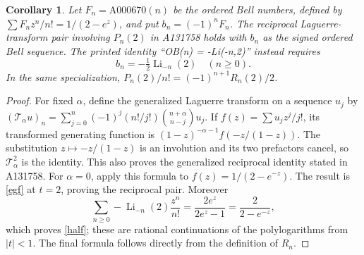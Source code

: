 \documentclass[11pt]{article}
\newtheorem{corollary}[theorem]{Corollary}
\begin{document}
\begin{corollary}\label{fubini}
Let $F_n=\mathrm{A000670}(n)$ be the ordered Bell numbers, defined by
$\sum F_n z^n/n!=1/(2-e^z)$, and put $b_n=(-1)^nF_n$.
The reciprocal Laguerre-transform pair involving $P_n(2)$ in A131758
holds with $b_n$ as the signed ordered Bell sequence.
The printed identity ``OB(n) = -Li(-n,2)'' instead requires
\begin{equation}\label{half}
 b_n=-\tfrac12\operatorname{Li}_{-n}(2)\quad(n\geq0).
\end{equation}
In the same specialization, $P_n(2)/n!=(-1)^{n+1}R_n(2)/2$.
\end{corollary}
\begin{proof}
For fixed $\alpha$, define the generalized Laguerre transform on a
sequence $u_j$ by
$ (\mathcal T_\alpha u)_n=\sum_{j=0}^n(-1)^j(n!/j!)
\binom{n+\alpha}{n-j}u_j$.
If $f(z)=\sum u_jz^j/j!$, its transformed generating function is
$(1-z)^{-\alpha-1}f(-z/(1-z))$. The substitution
$z\mapsto-z/(1-z)$ is an involution and its two prefactors cancel,
so $\mathcal T_\alpha^2$ is the identity. This also proves the
generalized reciprocal identity stated in A131758.
For $\alpha=0$, apply this formula to $f(z)=1/(2-e^{-z})$.
The result is \eqref{egf} at $t=2$, proving the reciprocal pair.
Moreover
\[
 \sum_{n\geq0}-\operatorname{Li}_{-n}(2)\frac{z^n}{n!}
 =\frac{2e^z}{2e^z-1}=\frac{2}{2-e^{-z}},
\]
which proves \eqref{half}; these are rational continuations of the
polylogarithms from $|t|<1$. The final formula follows directly from
the definition of $R_n$.
\end{proof}
\end{document}

